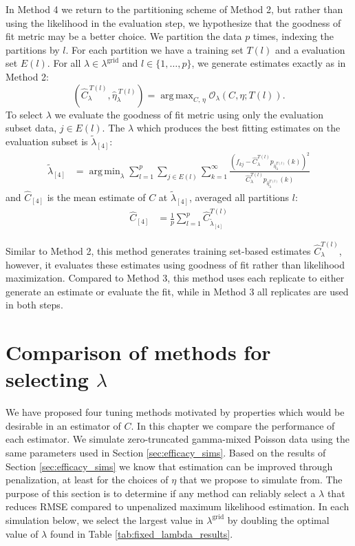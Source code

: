 \documentclass[12pt]{article}
\DeclareMathOperator*{\argmin}{arg\,min}
\DeclareMathOperator*{\argmax}{arg\,max}
\newcommand{\lambdagrid}{\lambda^{\text{grid}}}
\begin{document}
In Method 4 we return to the partitioning scheme of Method 2, but rather than using the likelihood in the evaluation step, we hypothesize that the goodness of fit metric may be a better choice.
We partition the data $p$ times, indexing the partitions by $l$. For each partition we have a training set $T(l)$ and a evaluation set $E(l)$.
For all $\lambda \in \lambdagrid$ and $l \in \{1, \dots , p \}$, we generate estimates exactly as in Method 2:
\begin{equation}
\left(\widehat{C}_{\lambda}^{ \ T(l)}, \widehat{\eta}_{\lambda}^{ \ T(l)} \right) = \argmax_{C, \, \eta} \mathcal{O}_\lambda \left(C, \eta; T(l) \right). \label{eq:c_hat_lambda_method_4}
\end{equation}
To select $\lambda$ we evaluate the goodness of fit metric using only the evaluation subset data, $j \in E(l)$.  The $\lambda$ which produces the best fitting estimates on the evaluation subset is $\widetilde{\lambda}_{[4]}$:
\begin{align}
\widetilde{\lambda}_{[4]} &= \argmin_{\lambda} \sum_{l = 1}^p \sum_{j \in E(l)} \sum_{k=1}^{\infty} \frac{ \left( f_{kj} - \widehat{C}_{\lambda}^{T(l)} p_{\widehat{\eta}_{\lambda}^{T(l)}}(k) \right)^2}{\widehat{C}_{\lambda}^{T(l)}p_{\widehat{\eta}_{\lambda}^{T(l)}}(k)}
\end{align}
and $\widehat{C}_{[4]}$ is the mean estimate of $C$ at  $\widetilde{\lambda}_{[4]}$, averaged all partitions $l$:
\begin{align}
\widehat{C}_{[4]} &= \frac{1}{p} \sum_{l=1}^p \widehat{C}_{\widetilde{\lambda}_{[4]}}^{T(l)}
\end{align}

Similar to Method 2, this method generates training set-based estimates $\widehat{C}^{T(l)}_{\lambda}$, however, it evaluates these estimates using goodness of fit rather than likelihood maximization.
Compared to Method 3, this method uses each replicate to either generate an estimate or evaluate the fit, while in Method 3 all replicates are used in both steps.

\section{Comparison of methods for selecting $\lambda$}
\label{sec:tuning_simulations}

We have proposed four tuning methods motivated by properties which would be desirable in an estimator of $C$.  In this chapter we compare the performance of each estimator.
We simulate zero-truncated gamma-mixed Poisson data using the same parameters used in Section \ref{sec:efficacy_sims}.
Based on the results of Section \ref{sec:efficacy_sims} we know that estimation can be improved through penalization, at least for the choices of $\eta$ that we propose to simulate from.  The purpose of this section is to determine if any method can reliably select a $\lambda$ that reduces RMSE compared to unpenalized maximum likelihood estimation.
In each simulation below, we select the largest value in $\lambdagrid$ by doubling the optimal value of $\lambda$ found in Table \ref{tab:fixed_lambda_results}.
\end{document}
